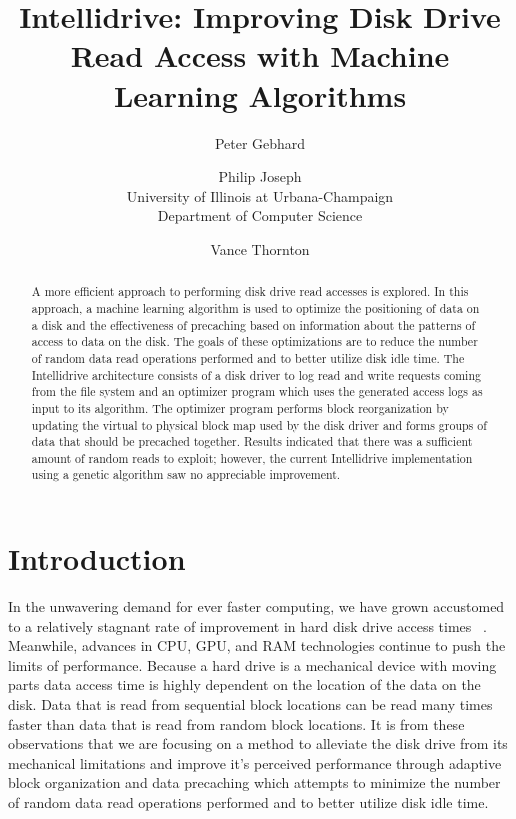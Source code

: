 \documentclass[letterpaper,twocolumn,10pt]{article}
\begin{document}
\date{}

\title{\Large \bf Intellidrive: Improving Disk Drive Read Access with Machine \\ Learning Algorithms}

\author{
{\rm Peter Gebhard}\\
\and
{\rm Philip Joseph}\\
University of Illinois at Urbana-Champaign \\
Department of Computer Science
\and
{\rm Vance Thornton}\\
} %

\maketitle

\thispagestyle{empty}

\begin{abstract}
A more efficient approach to performing disk drive read accesses is explored.  In this approach, a machine learning algorithm is used to optimize the positioning of data on a disk and the effectiveness of precaching based on information about the patterns of access to data on the disk.  The goals of these optimizations are to reduce the number of random data read operations performed and to better utilize disk idle time.  The Intellidrive architecture consists of a disk driver to log read and write requests coming from the file system and an optimizer program which uses the generated access logs as input to its algorithm.  The optimizer program performs block reorganization by updating the virtual to physical block map used by the disk driver and forms groups of data that should be precached together.  Results indicated that there was a sufficient amount of random reads to exploit; however, the current Intellidrive implementation using a genetic algorithm saw no appreciable improvement.
\end{abstract}

\section{Introduction}
In the unwavering demand for ever faster computing, we have grown accustomed to a relatively stagnant rate of improvement in hard disk drive access times ~\cite{CachingStrategies}.  Meanwhile, advances in CPU, GPU, and RAM technologies continue to push the limits of performance.  Because a hard drive is a mechanical device with moving parts data access time is highly dependent on the location of the data on the disk.  Data that is read from sequential block locations can be read many times faster than data that is read from random block locations.  It is from these observations that we are focusing on a method to alleviate the disk drive from its mechanical limitations and improve it's perceived performance through adaptive block organization and data precaching which attempts to minimize the number of random data read operations performed and to better utilize disk idle time.
\end{document}
